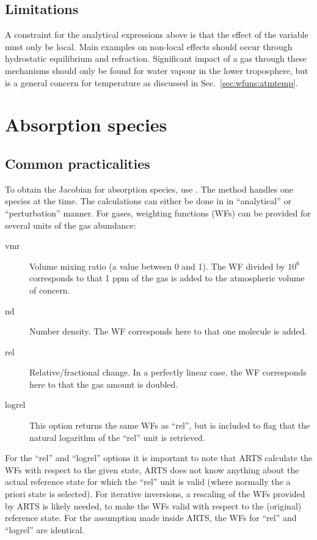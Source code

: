 \subsection{Limitations}
\label{sec:wfuns:atmvars:limit}
%
A constraint for the analytical expressions above is that the effect of the
variable must only be local. Main examples on non-local effects should occur
through hydrostatic equilibrium and refraction. Significant impact of a gas
through these mechanisms should only be found for water vapour in the lower
troposphere, but is a general concern for temperature as discussed in
Sec.~\ref{sec:wfuns:atmtemp}.





\section{Absorption species}
\label{sec:wfuns:absspecies}

\subsection{Common practicalities}
%
To obtain the Jacobian for absorption species, use
. The method handles one species at the time.
The calculations can either be done in in ``analytical'' or ``perturbation''
manner. For gases, weighting functions (WFs) can be provided for several units
of the gas abundance:
\begin{description}
\item[vmr] Volume mixing ratio (a value between 0 and 1). The WF divided by
  $10^6$ corresponds to that 1 ppm of the gas is added to the atmospheric
  volume of concern.
\item[nd] Number density. The WF corresponds here to that one molecule is added.
\item[rel] Relative/fractional change. In a perfectly linear case, the WF
  corresponds here to that the gas amount is doubled.
\item[logrel] This option returns the same WFs as ``rel'', but is included to
  flag that the natural logarithm of the ``rel'' unit is retrieved.
\end{description}
For the ``rel'' and ``logrel'' options it is important to note that ARTS
calculate the WFs with respect to the given state, ARTS does not know anything
about the actual reference state for which the ``rel'' unit is valid (where
normally the a priori state is selected). For iterative inversions, a rescaling
of the WFs provided by ARTS is likely needed, to make the WFs valid with
respect to the (original) reference state. For the assumption made inside ARTS,
the WFs for ``rel'' and ``logrel'' are identical.

